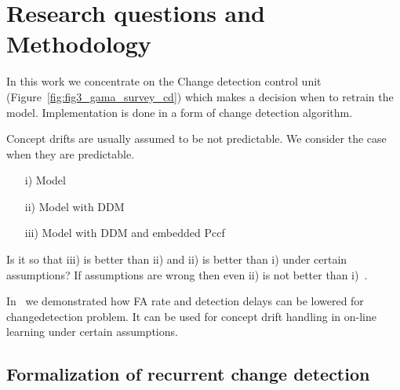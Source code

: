 \chapter{Research questions and Methodology}
In this work we concentrate on the Change detection control unit (Figure~\ref{fig:fig3_gama_survey_cd}) which makes a decision when to retrain the model.
Implementation is done in a form of change detection algorithm.

Concept drifts are usually assumed to be not predictable.
We consider the case when they are predictable.

\begin{itemize}
  \item [i)] Model
  \item [ii)] Model with DDM
  \item [iii)] Model with DDM and embedded Pccf
\end{itemize}

Is it so that iii) is better than ii) and ii) is better than i) under certain assumptions?
If assumptions are wrong then even ii) is not better than i)~\cite{SouzaRMB20}.

In~\cite{XXX} we demonstrated how FA rate and detection delays can be lowered for changedetection problem.
It can be used for concept drift handling in on-line learning under certain assumptions.


\section{Formalization of recurrent change detection}



